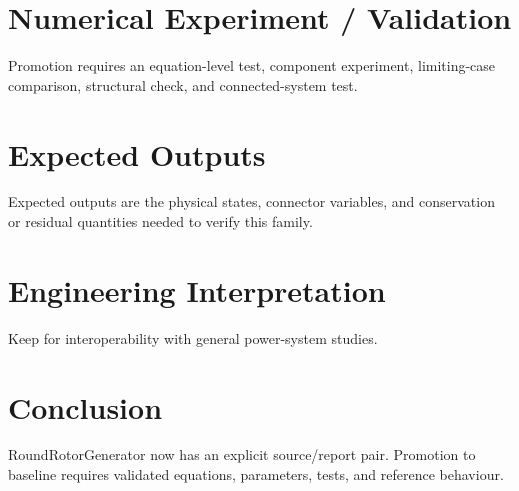 \documentclass[10pt,a4paper]{article}
\begin{document}
\section{Numerical Experiment / Validation}Promotion requires an equation-level test, component experiment, limiting-case comparison, structural check, and connected-system test.
\section{Expected Outputs}Expected outputs are the physical states, connector variables, and conservation or residual quantities needed to verify this family.
\section{Engineering Interpretation}Keep for interoperability with general power-system studies.
\section*{Conclusion}RoundRotorGenerator now has an explicit source/report pair. Promotion to baseline requires validated equations, parameters, tests, and reference behaviour.
\end{document}
